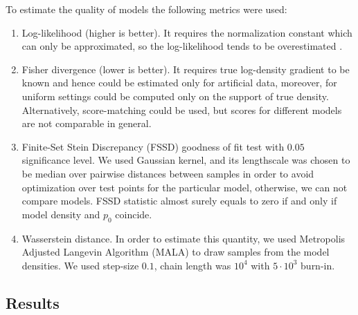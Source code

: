 To estimate the quality of models the following metrics were used:
\begin{enumerate}
    \item Log-likelihood (higher is better).
    It requires the normalization constant which can only be approximated, so
    the log-likelihood tends to be overestimated \cite{GrettonDeep}.
    \item Fisher divergence (lower is better).
    It requires true log-density gradient to be known and hence could be estimated only for
    artificial data, moreover, for uniform settings could be computed only on the support of
    true density.
    Alternatively, score-matching could be used, but scores for different models
    are not comparable in general.
    \item Finite-Set Stein Discrepancy (FSSD) goodness of fit test \cite{FSSD, GOF} with $0.05$
    significance level.
    We used Gaussian kernel, and its lengthscale was chosen to be median over
    pairwise distances between samples in order to avoid optimization over test points for the
    particular model, otherwise, we can not compare models.
    FSSD statistic almost surely equals to zero if and only if model density and $p_0$
    coincide.
    \item Wasserstein distance.
    In order to estimate this quantity, we used Metropolis Adjusted Langevin Algorithm (MALA)
    \cite{MALA} to draw samples from the model densities.
    We used step-size $0.1$, chain length was $10^4$ with $5\cdot 10^3$ burn-in.
\end{enumerate}

\subsection{Results}

